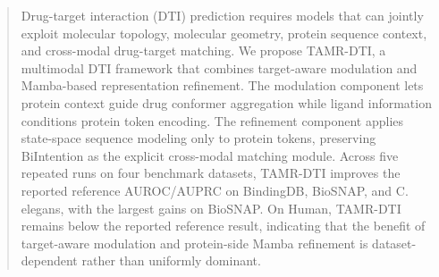 \begin{abstract}
Drug-target interaction (DTI) prediction requires models that can jointly exploit molecular topology, molecular geometry, protein sequence context, and cross-modal drug-target matching. We propose TAMR-DTI, a multimodal DTI framework that combines target-aware modulation and Mamba-based representation refinement. The modulation component lets protein context guide drug conformer aggregation while ligand information conditions protein token encoding. The refinement component applies state-space sequence modeling only to protein tokens, preserving BiIntention as the explicit cross-modal matching module. Across five repeated runs on four benchmark datasets, TAMR-DTI improves the reported reference AUROC/AUPRC on BindingDB, BioSNAP, and C. elegans, with the largest gains on BioSNAP. On Human, TAMR-DTI remains below the reported reference result, indicating that the benefit of target-aware modulation and protein-side Mamba refinement is dataset-dependent rather than uniformly dominant.
\end{abstract}
